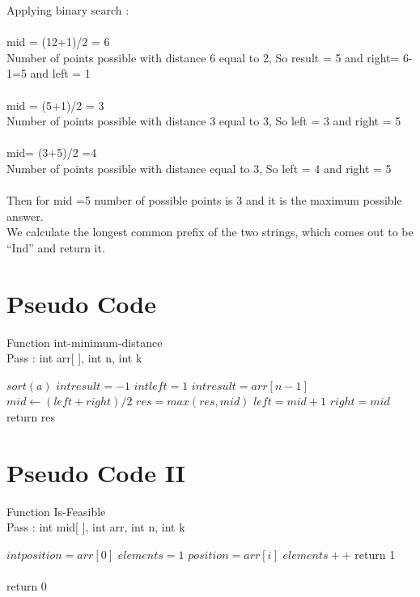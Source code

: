\documentclass[conference]{IEEEtran}
\begin{document}
\begin{enumerate}
Applying binary search :\\\\
mid = (12+1)/2 = 6\\
Number of points possible with distance 6 equal to 2, So result = 5 and right= 6-1=5 and left = 1\\\\
mid = (5+1)/2 = 3\\
Number of points possible with distance 3 equal to 3, So left = 3 and right = 5 \\\\
mid= (3+5)/2 =4\\
Number of points possible with distance equal to 3, So left = 4 and  right = 5\\\\
Then for mid =5 number of possible points is 3 and it is the maximum possible answer.\\

We calculate the longest common prefix of the two strings, which comes out to be “Ind” and return it.\\



\end{enumerate}

\section{\textbf{Pseudo Code}} 
\noindent Function int-minimum-distance \\
Pass : int arr[ ], int n, int k\\
\begin{algorithmic}
    \STATE $sort(a)$
    \STATE $int result = -1$
    \STATE $int left = 1$
    \STATE $int result = arr[n-1]$
	  \STATE  $mid \gets (left+right)/2 $
	      \STATE	$res = max(res,mid)$
	      \STATE	$left = mid+1$
        \ELSE
          \STATE	$right=mid$\\
return res
\end{algorithmic}

\section{\textbf{Pseudo Code II}}
\noindent Function Is-Feasible \\
Pass : int mid[ ], int arr, int n, int k\\
\begin{algorithmic}
   \STATE	$int position = arr[0]$
   \STATE	$elements = 1$
        \STATE $position=arr[i]$
        \STATE $elements++$
           return 1
        \ENDIF\\
     \ENDIF
    \ENDFOR\\ 
return 0           
\end{algorithmic}
\end{document}
